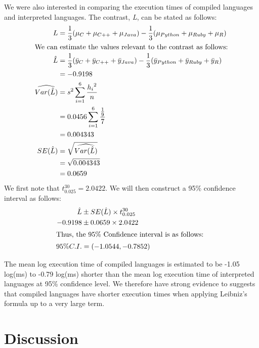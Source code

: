 \documentclass[12pt,halfline,a4paper,]{ouparticle}
\begin{document}
We were also interested in comparing the execution times of compiled
languages and interpreted languages. The contrast, \emph{L}, can be
stated as follows: \begin{align*}
L &= \frac{1}{3} (\mu_C + \mu_{C++} + \mu_{Java}) - \frac{1}{3}(\mu_{Python} + \mu_{Ruby} + \mu_{R})\\
\intertext{We can estimate the values relevant to the contrast as follows:}
\hat{L} &= \frac{1}{3} (\bar{y}_C + \bar{y}_{C++} + \bar{y}_{Java}) - \frac{1}{3}(\bar{y}_{Python} + \bar{y}_{Ruby} + \bar{y}_{R})\\
&= -0.9198 \\
\widehat{Var(\hat{L})} &= s^{2} \sum_{i=1}^{6} \frac{{h_i}^2}{n}\\
&= 0.0456\sum_{i=1}^{6}\frac{\frac{1}{9}}{7}\\
&= 0.004343\\
SE(\hat{L}) &= \sqrt{\widehat{Var(\hat{L})}}\\
 &= \sqrt{0.004343}\\
 &= 0.0659
\end{align*} We first note that \(t_{0.025}^{30} = 2.0422\). We will
then construct a 95\% confidence interval as follows: \begin{align*}
\hat{L}&\pm SE(\hat{L})\times t_{0.025}^{30}\\
-0.9198 &\pm 0.0659 \times 2.0422\\
\intertext{Thus, the 95\% Confidence interval is as follows: }
95\%C.I. &= (-1.0544 ,-0.7852)
\end{align*}

The mean log execution time of compiled languages is estimated to be
-1.05 log(ms) to -0.79 log(ms) shorter than the mean log execution time
of interpreted languages at 95\% confidence level. We therefore have
strong evidence to suggests that compiled languages have shorter
execution times when applying Leibniz's formula up to a very large term.
\newpage

\section{Discussion}\label{discussion}
\end{document}
